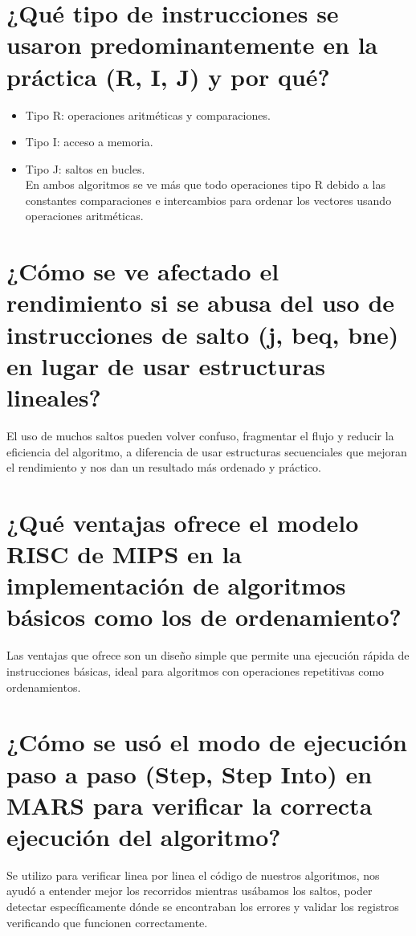 \documentclass[12pt]{article}
\begin{document}
\section{¿Qué tipo de instrucciones se usaron predominantemente en la práctica (R, I, J) y por 
qué?}
\begin{itemize}
    \item Tipo R: operaciones aritméticas y comparaciones.
    \item Tipo I: acceso a memoria.
    \item Tipo J: saltos en bucles. 
    \\
    En ambos algoritmos se ve más que todo operaciones tipo R debido a las constantes comparaciones e intercambios para ordenar los vectores usando operaciones aritméticas.
\end{itemize}

\section{¿Cómo se ve afectado el rendimiento si se abusa del uso de instrucciones de salto (j, beq, 
bne) en lugar de usar estructuras lineales?}
\begin{itemize}
    El uso de muchos saltos pueden volver confuso, fragmentar el flujo y reducir la eficiencia del algoritmo, a diferencia de usar estructuras secuenciales que mejoran el rendimiento y nos dan un resultado más ordenado y práctico.
\end{itemize}

\section{¿Qué ventajas ofrece el modelo RISC de MIPS en la implementación de algoritmos 
básicos como los de ordenamiento?}
\begin{itemize}
    Las ventajas que ofrece son un diseño simple que permite una ejecución rápida de instrucciones básicas, ideal para algoritmos con operaciones repetitivas como ordenamientos.
\end{itemize}

\section{¿Cómo se usó el modo de ejecución paso a paso (Step, Step Into) en MARS para verificar 
la correcta ejecución del algoritmo?}
\begin{itemize}
    Se utilizo para verificar linea por linea el código de nuestros algoritmos, nos ayudó a entender mejor los recorridos mientras usábamos los saltos, poder detectar específicamente dónde se encontraban los errores y validar los registros verificando que funcionen correctamente.
\end{itemize}
\end{document}

